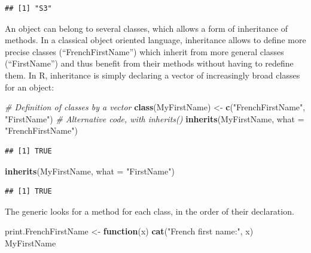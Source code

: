 \documentclass[
  12pt,
  american,
  a4paper,
  extrafontsizes,onecolumn,openright
  ]{memoir}
\newenvironment{Shaded}{\begin{snugshade}}{\end{snugshade}}
\newcommand{\AttributeTok}[1]{\textcolor[rgb]{0.13,0.29,0.53}{#1}}
\newcommand{\CommentTok}[1]{\textcolor[rgb]{0.56,0.35,0.01}{\textit{#1}}}
\newcommand{\ControlFlowTok}[1]{\textcolor[rgb]{0.13,0.29,0.53}{\textbf{#1}}}
\newcommand{\FunctionTok}[1]{\textcolor[rgb]{0.13,0.29,0.53}{\textbf{#1}}}
\newcommand{\NormalTok}[1]{#1}
\newcommand{\OtherTok}[1]{\textcolor[rgb]{0.56,0.35,0.01}{#1}}
\newcommand{\StringTok}[1]{\textcolor[rgb]{0.31,0.60,0.02}{#1}}
\begin{document}
\begin{verbatim}
## [1] "S3"
\end{verbatim}

\normalsize

An object can belong to several classes, which allows a form of inheritance of methods.
In a classical object oriented language, inheritance allows to define more precise classes (\enquote{FrenchFirstName}) which inherit from more general classes (\enquote{FirstName}) and thus benefit from their methods without having to redefine them.
In R, inheritance is simply declaring a vector of increasingly broad classes for an object:

\scriptsize

\begin{Shaded}
\begin{Highlighting}[]
\CommentTok{\# Definition of classes by a vector}
\FunctionTok{class}\NormalTok{(MyFirstName) }\OtherTok{\textless{}{-}} \FunctionTok{c}\NormalTok{(}\StringTok{"FrenchFirstName"}\NormalTok{, }\StringTok{"FirstName"}\NormalTok{)}
\CommentTok{\# Alternative code, with inherits()}
\FunctionTok{inherits}\NormalTok{(MyFirstName, }\AttributeTok{what =} \StringTok{"FrenchFirstName"}\NormalTok{)}
\end{Highlighting}
\end{Shaded}

\begin{verbatim}
## [1] TRUE
\end{verbatim}

\begin{Shaded}
\begin{Highlighting}[]
\FunctionTok{inherits}\NormalTok{(MyFirstName, }\AttributeTok{what =} \StringTok{"FirstName"}\NormalTok{)}
\end{Highlighting}
\end{Shaded}

\begin{verbatim}
## [1] TRUE
\end{verbatim}

\normalsize

The generic looks for a method for each class, in the order of their declaration.

\scriptsize

\begin{Shaded}
\begin{Highlighting}[]
\NormalTok{print.FrenchFirstName }\OtherTok{\textless{}{-}} \ControlFlowTok{function}\NormalTok{(x) }\FunctionTok{cat}\NormalTok{(}\StringTok{"French first name:"}\NormalTok{,}
\NormalTok{    x)}
\NormalTok{MyFirstName}
\end{Highlighting}
\end{Shaded}
\end{document}
